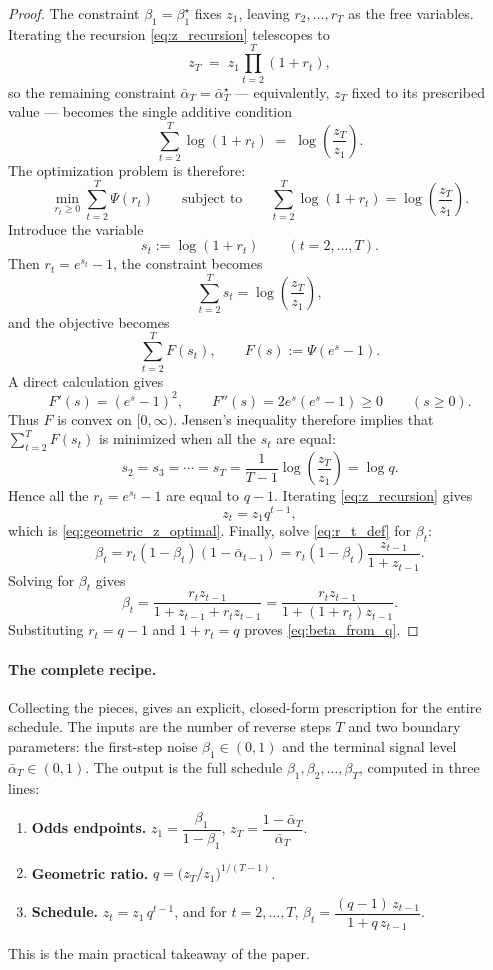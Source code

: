 \documentclass[11pt]{article}
\newcommand{\PsiFn}{\Psi}
\begin{document}
\begin{proof}
The constraint \(\beta_1=\beta_1^\star\) fixes \(z_1\), leaving \(r_2,\dots,r_T\) as the free variables. Iterating the recursion \eqref{eq:z_recursion} telescopes to 
\[
z_T \;=\; z_1\prod_{t=2}^T(1+r_t),
\]
so the remaining constraint \(\bar\alpha_T=\bar\alpha_T^\star\) --- equivalently, \(z_T\) fixed to its prescribed value --- becomes the single additive condition
\[
\sum_{t=2}^T \log(1+r_t)\;=\;\log\!\left(\frac{z_T}{z_1}\right).
\]
The optimization problem is therefore:
\[
\min_{r_t\ge 0}
\sum_{t=2}^T \PsiFn(r_t)
\qquad\text{subject to}\qquad
\sum_{t=2}^T \log(1+r_t)=\log\left(\frac{z_T}{z_1}\right).
\]
Introduce the variable
\[
s_t := \log(1+r_t)\qquad (t=2,\dots,T).
\]
Then \(r_t=e^{s_t}-1\), the constraint becomes
\[
\sum_{t=2}^T s_t = \log\left(\frac{z_T}{z_1}\right),
\]
and the objective becomes
\[
\sum_{t=2}^T F(s_t),
\qquad
F(s):=\PsiFn(e^s-1).
\]
A direct calculation gives
\[
F'(s)=(e^s-1)^2,
\qquad
F''(s)=2e^s(e^s-1)\ge 0
\qquad (s\ge 0).
\]
Thus \(F\) is convex on \([0,\infty)\). Jensen's inequality therefore implies that \(\sum_{t=2}^T F(s_t)\) is minimized when all the \(s_t\) are equal:
\[
s_2=s_3=\cdots=s_T
= \frac{1}{T-1}\log\left(\frac{z_T}{z_1}\right)
=\log q.
\]
Hence all the \(r_t=e^{s_t}-1\) are equal to \(q-1\). Iterating \eqref{eq:z_recursion} gives
\[
z_t = z_1 q^{t-1},
\]
which is \eqref{eq:geometric_z_optimal}. Finally, solve \eqref{eq:r_t_def} for \(\beta_t\):
\[
\beta_t = r_t(1-\beta_t)(1-\bar\alpha_{t-1}) = r_t(1-\beta_t)\frac{z_{t-1}}{1+z_{t-1}}.
\]
Solving for \(\beta_t\) gives
\[
\beta_t = \frac{r_t z_{t-1}}{1+z_{t-1}+r_t z_{t-1}}
= \frac{r_t z_{t-1}}{1+(1+r_t)z_{t-1}}.
\]
Substituting \(r_t=q-1\) and \(1+r_t=q\) proves \eqref{eq:beta_from_q}.\qedhere
\end{proof}

\paragraph{The complete recipe.} Collecting the pieces,  gives an explicit, closed-form prescription for the entire schedule. The inputs are the number of reverse steps \(T\) and two boundary parameters: the first-step noise \(\beta_1\in(0,1)\) and the terminal signal level \(\bar\alpha_T\in(0,1)\). The output is the full schedule \(\beta_1,\beta_2,\dots,\beta_T\), computed in three lines:
\begin{enumerate}
\item \textbf{Odds endpoints.} \(z_1 = \dfrac{\beta_1}{1-\beta_1}\), \qquad \(z_T = \dfrac{1-\bar\alpha_T}{\bar\alpha_T}\).
\item \textbf{Geometric ratio.} \(q = \bigl(z_T/z_1\bigr)^{1/(T-1)}\).
\item \textbf{Schedule.} \(z_t = z_1\,q^{t-1}\), and for \(t=2,\dots,T\),
\(\beta_t = \dfrac{(q-1)\,z_{t-1}}{1+q\,z_{t-1}}\).
\end{enumerate}
This is the main practical takeaway of the paper.
\end{document}

